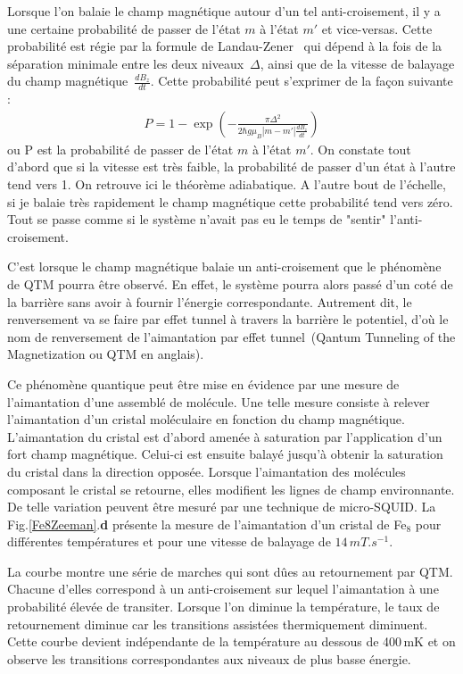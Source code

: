 Lorsque l'on balaie le champ magnétique autour d'un tel anti-croisement, il y a une certaine probabilité de passer de l'état $m$ à l'état $m'$ et vice-versas. Cette probabilité est régie par la formule de Landau-Zener~\cite{Zener1932} qui dépend à la fois de la séparation minimale entre les deux niveaux~$\Delta$, ainsi que de la vitesse de balayage du champ magnétique~$\frac{dB_z}{dt}$. Cette probabilité peut s'exprimer de la façon suivante :
\begin{eqnarray}
P = 1 - \exp \left( -\frac{\pi \Delta^2}{2 \hbar g \mu_B |m-m'|\frac{dB_z}{dt}} \right)
\end{eqnarray}
ou P est la probabilité de passer de l'état $m$ à l'état $m'$. On constate tout d'abord que si la vitesse est très faible, la probabilité de passer d'un état à l'autre tend vers 1. On retrouve ici le théorème adiabatique. A l'autre bout de l'échelle, si je balaie très rapidement le champ magnétique cette probabilité tend vers zéro. Tout se passe comme si le système n'avait pas eu le temps de "sentir" l'anti-croisement.


C'est lorsque le champ magnétique balaie un anti-croisement que le phénomène de QTM pourra être observé. En effet, le système pourra alors passé d'un coté de la barrière sans avoir à fournir l'énergie correspondante. Autrement dit, le renversement va se faire par effet tunnel à travers la barrière le potentiel, d'où le nom de renversement de l'aimantation par effet tunnel~(Qantum Tunneling of the Magnetization ou QTM en anglais).

Ce phénomène quantique peut être mise en évidence par une mesure de l'aimantation d'une assemblé de molécule. Une telle mesure consiste à relever l'aimantation d'un cristal moléculaire en fonction du champ magnétique. L'aimantation du cristal est d'abord amenée à saturation par l'application d'un fort champ magnétique. Celui-ci est ensuite balayé jusqu'à obtenir la saturation du cristal dans la direction opposée. Lorsque l'aimantation des molécules composant le cristal se retourne, elles modifient les lignes de champ environnante. De telle variation peuvent \^etre mesuré par une technique de micro-SQUID. La Fig.\ref{Fe8Zeeman}.\textbf{d} présente la mesure de l'aimantation d'un cristal de Fe$_8$ pour différentes températures et pour une vitesse de balayage de $14\,mT.s^{-1}$.

La courbe montre une série de marches qui sont d\^ues au retournement par QTM. Chacune d'elles correspond à un anti-croisement sur lequel l'aimantation à une probabilité élevée de transiter. Lorsque l'on diminue la température, le taux de retournement diminue car les transitions assistées thermiquement diminuent. Cette courbe devient indépendante de la température au dessous de 400\,mK et on observe les transitions correspondantes aux niveaux de plus basse énergie. 

